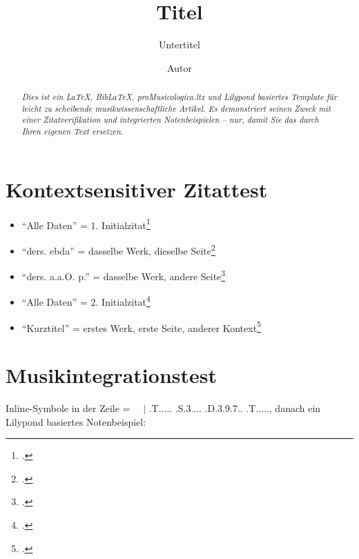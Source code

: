 \documentclass[
  DIV=calc,
  BCOR=5mm,
  11pt,
  headings=small,
  oneside,
  abstract=true,
  toc=bib,
  english,ngerman]{scrartcl}
\begin{document}
\nocite{*}

\titlehead{Klassifikation}
\subject{Release }
\title{Titel}
\subtitle{Untertitel}
\author{Autor}

\maketitle

\begin{abstract}
\noindent \itshape
Dies ist ein \LaTeX, Bib\LaTeX, \emph{proMusicologica.ltx} und \emph{Lilypond} basiertes Template für leicht zu scheibende musikwissenschaftliche Artikel. Es demonstriert seinen Zweck mit einer Zitatverifikation und integrierten Notenbeispielen -- nur, damit Sie das durch Ihren eigenen Text ersetzen.
\end{abstract}

\footnotesize
\tableofcontents
\normalsize

\section{Kontextsensitiver Zitattest}

\begin{itemize}
  \item \enquote{Alle Daten} = 1. Initialzitat\footcite[vgl.][123]{Grabner1974a}
  \item \enquote{ders. ebda} = dasselbe Werk, dieselbe Seite\footcite[vgl.][123]{Grabner1974a}
  \item \enquote{ders. a.a.O. p.} = dasselbe Werk, andere Seite\footcite[vgl.][125f]{Grabner1974a}
  \item \enquote{Alle Daten} = 2. Initialzitat\footcite[vgl.][123]{Delamotte2011a}
  \item \enquote{Kurztitel} = erstes Werk, erste Seite, anderer  Kontext\footcite[vgl.][123]{Grabner1974a}
\end{itemize}

\section{Musikintegrationstest}

Inline-Symbole in der Zeile =  \SePa \Vier\SechBL\SechBL\ \Halb\Pu\ $|$ \HH.T..... \HH.S.3.... \HH.D.3.9.7.. \HH.T....., danach ein Lilypond basiertes Notenbeispiel:
\end{document}
